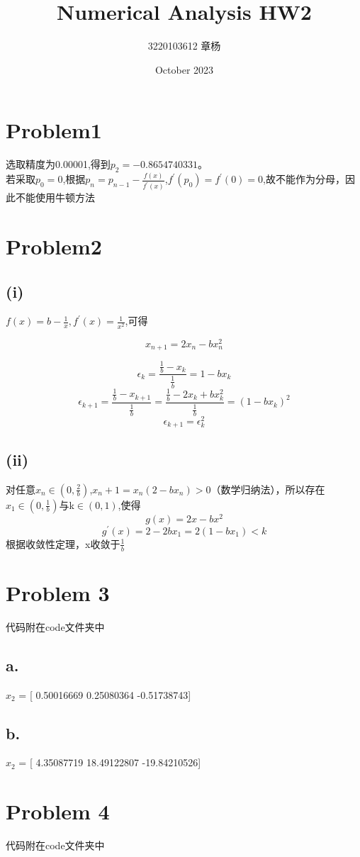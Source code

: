 \documentclass{article}
\title{Numerical Analysis HW2}
\author{3220103612 章杨}
\date{October 2023}
\begin{document}
\maketitle
\large
\section{Problem1}
选取精度为0.00001,得到$p_2=-0.8654740331$。\\

若采取$p_0=0$,根据$p_n=p_{n-1}-\frac{f(x)}{f^{'}(x)}$,$f^{'}(p_0)=f^{'}(0)=0$,故不能作为分母，因此不能使用牛顿方法

\section{Problem2}
\subsection{(i)}
$f(x)=b-\frac{1}{x},f^{'}(x)=\frac{1}{x^2}$,可得

$$    x_{n+1}=2x_n-bx^{2}_n $$

$$\epsilon_k=\frac{\frac{1}{b}-x_k}{\frac{1}{b}}=1-bx_k$$
$$\epsilon_{k+1}=\frac{\frac{1}{b}-x_{k+1}}{\frac{1}{b}}=\frac{\frac{1}{b}-2x_k+bx^2_k}{\frac{1}{b}}=(1-bx_k)^2$$
$$ \epsilon_{k+1}=\epsilon_k^2$$
\subsection{(ii)}
对任意$x_n\in (0,\frac{2}{b})$,$x_n+1 =x_n(2-bx_n)>0$（数学归纳法），所以存在$x_1\in(0,\frac{1}{b})$与k$\in(0,1)$,使得
$$g(x)=2x-bx^2$$
$$g^{'}(x)=2-2bx_1=2(1-bx_1)<k$$
根据收敛性定理，x收敛于$\frac{1}{b}$

\section{Problem 3}
代码附在code文件夹中
\subsection{a.}
$x_2$ =  [ 0.50016669  0.25080364 -0.51738743]
\subsection{b.}
$x_2$ =  [  4.35087719  18.49122807 -19.84210526]
\section{Problem 4}
代码附在code文件夹中
\end{document}
